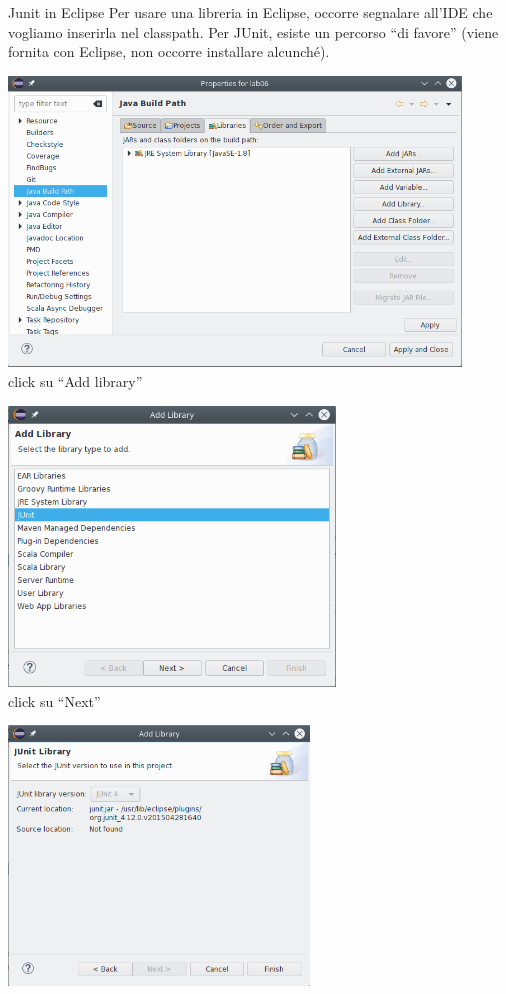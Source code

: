 \documentclass[xcolor=dvipsnames,presentation]{beamer}
\begin{document}
\begin{frame}[allowframebreaks]{Junit in Eclipse}
	Per usare una libreria in Eclipse, occorre segnalare all'IDE che vogliamo inserirla nel classpath. Per JUnit, esiste un percorso ``di favore'' (viene fornita con Eclipse, non occorre installare alcunché).
  \begin{center}
    \includegraphics[width=0.9\textwidth]{junit/e1}\\
    click su ``Add library''
  \end{center}
  \begin{center}
    \includegraphics[width=0.65\textwidth]{junit/e2}\\
    click su ``Next''
  \end{center}
  \begin{center}
    \includegraphics[width=0.6\textwidth]{junit/e3}\\

\end{center}
\end{frame}
\end{document}
